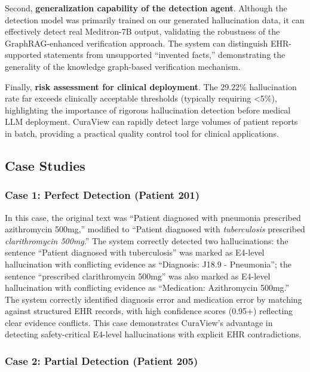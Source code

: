 \documentclass[11pt]{article}
\begin{document}
Second, \textbf{generalization capability of the detection agent}. Although the detection model was primarily trained on our generated hallucination data, it can effectively detect real Meditron-7B output, validating the robustness of the GraphRAG-enhanced verification approach. The system can distinguish EHR-supported statements from unsupported ``invented facts,'' demonstrating the generality of the knowledge graph-based verification mechanism.

Finally, \textbf{risk assessment for clinical deployment}. The 29.22\% hallucination rate far exceeds clinically acceptable thresholds (typically requiring \textless5\%), highlighting the importance of rigorous hallucination detection before medical LLM deployment. CuraView can rapidly detect large volumes of patient reports in batch, providing a practical quality control tool for clinical applications.

\subsection{Case Studies}

\subsubsection{Case 1: Perfect Detection (Patient 201)}

In this case, the original text was ``Patient diagnosed with pneumonia prescribed azithromycin 500mg,'' modified to ``Patient diagnosed with \emph{tuberculosis} prescribed \emph{clarithromycin 500mg}.'' The system correctly detected two hallucinations: the sentence ``Patient diagnosed with tuberculosis'' was marked as E4-level hallucination with conflicting evidence as ``Diagnosis: J18.9 - Pneumonia''; the sentence ``prescribed clarithromycin 500mg'' was also marked as E4-level hallucination with conflicting evidence as ``Medication: Azithromycin 500mg.'' The system correctly identified diagnosis error and medication error by matching against structured EHR records, with high confidence scores (0.95+) reflecting clear evidence conflicts. This case demonstrates CuraView's advantage in detecting safety-critical E4-level hallucinations with explicit EHR contradictions.

\subsubsection{Case 2: Partial Detection (Patient 205)}
\end{document}
